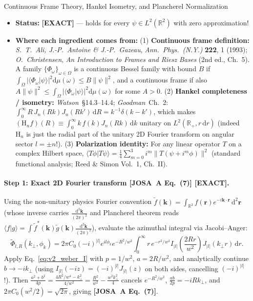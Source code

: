 \documentclass[10pt,letterpaper]{article}
\newcommand{\braket}[2]{\langle #1 | #2 \rangle}
\newcommand{\norm}[1]{\lVert #1 \rVert}
\newcommand{\abs}[1]{\lvert #1 \rvert}
\newcommand{\dd}{\mathrm{d}}
\newcommand{\josa}[1]{\textbf{[JOSA~A Eq.~(#1)]}}
\newcommand{\tagexact}{\textcolor{forest}{\textbf{[EXACT]}}}
\numberwithin{equation}{section}
\begin{document}
\begin{approxbox}{Continuous Frame Theory, Hankel Isometry, and Plancherel Normalization}
\begin{itemize}[leftmargin=1.4em,itemsep=2pt,topsep=1pt]
  \item \textbf{Status:} \tagexact{} --- holds for every $\psi \in L^2(\mathbb{R}^2)$ with zero approximation!
  \item \textbf{Where each ingredient comes from:}
    (1) \textbf{Continuous frame definition:} \emph{S.\ T.\ Ali, J.-P.\ Antoine \& J.-P.\ Gazeau}, \emph{Ann.\ Phys.\ (N.Y.)} \textbf{222}, 1 (1993); \emph{O.\ Christensen}, \emph{An Introduction to Frames and Riesz Bases} (2nd ed., Ch.~5). A family $\{\Phi_\omega\}_{\omega\in\Omega}$ is a continuous Bessel family with bound $B$ if $\int_\Omega \abs{\braket{\Phi_\omega}{\psi}}^2\dd\mu(\omega) \le B\norm{\psi}^2$, and a continuous frame if also $A\norm{\psi}^2 \le \int_\Omega\abs{\braket{\Phi_\omega}{\psi}}^2\dd\mu(\omega)$ for some $A > 0$.
    (2) \textbf{Hankel completeness / isometry:} \emph{Watson}~\S14.3--14.4; \emph{Goodman}~Ch.~2: $\int_0^\infty R\,J_n(Rk) J_n(Rk')\,\dd R = k^{-1}\delta(k-k')$, which makes $(\mathrm{H}_n f)(R) \equiv \int_0^\infty k\,f(k) J_n(Rk)\,\dd k$ unitary on $L^2(\mathbb{R}_+, r\,\dd r)$ (indeed $\mathrm{H}_n$ is just the radial part of the unitary 2D Fourier transform on angular sector $l = \pm n$!).
    (3) \textbf{Polarization identity:} For any linear operator $T$ on a complex Hilbert space, $\braket{T\phi}{T\psi} = \frac{1}{4}\sum_{m=0}^3 i^m\norm{T(\psi + i^m\phi)}^2$ (standard functional analysis; Reed \& Simon Vol.~1, Ch.~II).
\end{itemize}
\end{approxbox}

\paragraph*{Step 1: Exact 2D Fourier transform \josa{7} \tagexact{}.}
Using the non-unitary physics Fourier convention $\widetilde{f}(\mathbf{k}) = \int_{\mathbb{R}^2} f(\mathbf{r}) e^{-i\mathbf{k}\cdot\mathbf{r}}\,\dd^2\mathbf{r}$ (whose inverse carries $\frac{\dd^2\mathbf{k}}{(2\pi)^2}$ and Plancherel theorem reads $\braket{f}{g} = \int \widetilde{f}^*(\mathbf{k})\widetilde{g}(\mathbf{k})\frac{\dd^2\mathbf{k}}{(2\pi)^2}$), evaluate the azimuthal integral via Jacobi--Anger:
\begin{equation}
  \widetilde{\Phi}_{l,R}(k_\perp,\phi_k) = 2\pi C_0(-i)^{\abs{l}} e^{il\phi_k} e^{-R^2/w^2}\int_0^\infty r\,e^{-r^2/w^2} I_{\abs{l}}\!\left(\frac{2Rr}{w^2}\right) J_{\abs{l}}(k_\perp r)\,\dd r.
\end{equation}
Apply Eq.~\eqref{eq:v2_weber_I} with $p = 1/w^2$, $a = 2R/w^2$, and analytically continue $b \to -i k_\perp$ (using $I_{\abs{l}}(-iz) = (-i)^{\abs{l}} J_{\abs{l}}(z)$ on both sides, cancelling $(-i)^{\abs{l}}$!). Then $\frac{a^2+b^2}{4p} = \frac{4R^2/w^4 - k_\perp^2}{4/w^2} = \frac{R^2}{w^2} - \frac{w^2 k_\perp^2}{4}$ cancels $e^{-R^2/w^2}$, $\frac{ab}{2p} = -i R k_\perp$, and $2\pi C_0 (w^2/2) = \sqrt{2\pi}$, giving \josa{7}.
\end{document}
